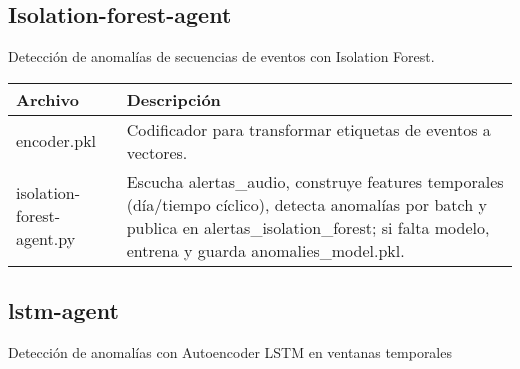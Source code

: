 \subsection*{Isolation-forest-agent}

Detección de anomalías de secuencias de eventos con Isolation Forest.

\begin{table}[H]
  \doublespacing
  \begin{tabularx}{\textwidth}{l X}
    \hline
    \textbf{Archivo}          & \textbf{Descripción}                                                                                                                                                         \\
    \hline
    encoder.pkl               &
    Codificador para transformar etiquetas de eventos a vectores.                                                                                                                                            \\
    isolation-forest-agent.py &
    Escucha alertas\_audio, construye features temporales (día/tiempo cíclico), detecta anomalías por batch y publica en alertas\_isolation\_forest; si falta modelo, entrena y guarda anomalies\_model.pkl. \\
    \hline
  \end{tabularx}
\end{table}

\subsection*{lstm-agent}

Detección de anomalías con Autoencoder LSTM en ventanas temporales

